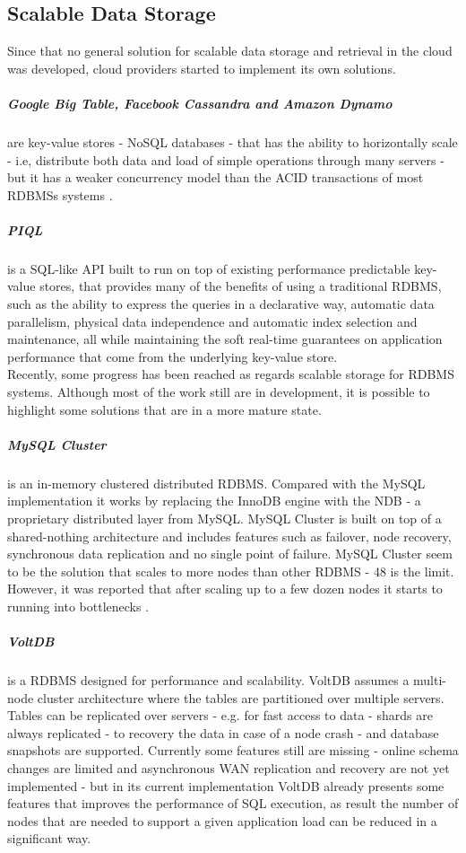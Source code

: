 \subsection{Scalable Data Storage}
\label{sub:data_storage}
Since that no general solution for scalable data storage and retrieval in the cloud was developed,
cloud providers started to implement its own solutions.

\subparagraph{Google Big Table, Facebook Cassandra and  Amazon Dynamo} \cite{chang2008bigtable} \cite{lakshman2010cassandra}
\cite{decandia2007dynamo} are key-value stores - \gls{NoSQL} databases - that has the ability to horizontally scale - i.e,
distribute both data and load of simple operations through many servers - but it has a weaker concurrency model
than the ACID transactions of most \glspl{RDBMS} systems \cite{cattell2011scalable}.

\subparagraph{\gls{PIQL}} \cite{armbrust2010piql} is a SQL-like API built to run on top of existing
performance predictable key-value stores, that provides many of the benefits of using a traditional
\gls{RDBMS}, such as the ability to express the queries in a declarative way, automatic data
parallelism, physical data independence and automatic index selection and maintenance, all while
maintaining the soft real-time guarantees on application performance that come from the underlying
key-value store.\\

Recently, some progress has been reached as regards scalable storage for \gls{RDBMS} systems. Although
most of the work still are in development, it is possible to highlight some solutions that are in a more
mature state.

\subparagraph{MySQL Cluster} \cite{ronstrom2004mysql} is an in-memory clustered distributed \gls{RDBMS}.
Compared with the MySQL implementation it works by replacing the InnoDB engine with the NDB - a proprietary
distributed layer from MySQL. MySQL Cluster is built on top of a shared-nothing architecture and includes
features such as failover, node recovery, synchronous data replication and no single point of failure.
MySQL Cluster seem to be the solution that scales to more nodes than other \gls{RDBMS} - 48 is the limit.
However, it was reported that after scaling up to a few dozen nodes it starts to running into
bottlenecks \cite{bunch2010evaluation}.

\subparagraph{VoltDB} \cite{stonebraker2013voltdb} is a \gls{RDBMS} designed for performance and scalability.
VoltDB assumes a multi-node cluster architecture where the tables are partitioned over multiple servers.
Tables can be replicated over servers - e.g. for fast access to data - shards are always replicated -
to recovery the data in case of a node crash - and database snapshots are supported. Currently some
features still are missing - online schema changes are limited and asynchronous \gls{WAN} replication and
recovery are not yet implemented - but in its current implementation VoltDB already presents some
features that improves the performance of SQL execution, as result the number of nodes that are needed
to support a given application load can be reduced in a significant way.

